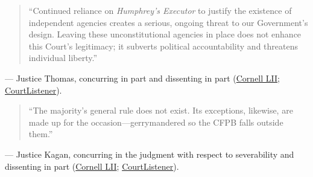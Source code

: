 \documentclass[12pt]{article}
\begin{document}
\begin{quote}
``Continued reliance on \textit{Humphrey's Executor} to justify the existence of independent agencies creates a serious, ongoing threat to our Government's design. Leaving these unconstitutional agencies in place does not enhance this Court's legitimacy; it subverts political accountability and threatens individual liberty.''
\end{quote}
\noindent --- Justice Thomas, concurring in part and dissenting in part (\href{https://www.law.cornell.edu/supremecourt/text/19-7}{Cornell LII}; \href{https://www.courtlistener.com/opinion/4764451/seila-law-llc-v-consumer-financial-protection-bureau/}{CourtListener}).

\begin{quote}
``The majority's general rule does not exist. Its exceptions, likewise, are made up for the occasion---gerrymandered so the CFPB falls outside them.''
\end{quote}
\noindent --- Justice Kagan, concurring in the judgment with respect to severability and dissenting in part (\href{https://www.law.cornell.edu/supremecourt/text/19-7}{Cornell LII}; \href{https://www.courtlistener.com/opinion/4764451/seila-law-llc-v-consumer-financial-protection-bureau/}{CourtListener}).
\end{document}
